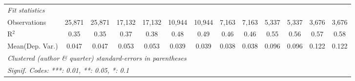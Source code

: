 \begin{tabular}{lcccccccccccc}
   \midrule
   \emph{Fit statistics}\\
   Observations                             & 25,871         & 25,871         & 17,132         & 17,132         & 10,944      & 10,944        & 7,163   & 7,163          & 5,337         & 5,337          & 3,676         & 3,676\\  
   R$^2$                                    & 0.35           & 0.35           & 0.37           & 0.38           & 0.48        & 0.49          & 0.46    & 0.46           & 0.55          & 0.56           & 0.57          & 0.58\\  
Mean(Dep. Var.) & 0.047 & 0.047 & 0.053 & 0.053 & 0.039 & 0.039 & 0.038 & 0.038 & 0.096 & 0.096 & 0.122 & 0.122 \\
   \midrule \midrule
   \multicolumn{13}{l}{\emph{Clustered (author \& quarter) standard-errors in parentheses}}\\
   \multicolumn{13}{l}{\emph{Signif. Codes: ***: 0.01, **: 0.05, *: 0.1}}\\
\end{tabular}
\par\endgroup
